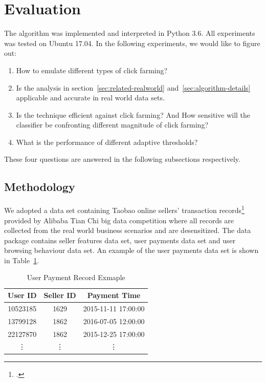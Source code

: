 \documentclass[a4paper]{IEEEtran}
\begin{document}
	\section{Evaluation}\label{sec:evaluation}
		The algorithm was implemented and interpreted in Python 3.6. All experiments was tested on Ubuntu 17.04. In the following experiments, we would like to figure out:
		
		\begin{enumerate}
			\item How to emulate different types of click farming?
			\item Is the analysis in section~\ref{sec:related-realworld} and~\ref{sec:algorithm-details} applicable and accurate in real world data sets.
			\item Is the technique efficient against click farming? And How sensitive will the classifier be confronting different magnitude of click farming?
			\item What is the performance of different adaptive thresholds?
		\end{enumerate}
		
		These four questions are answered in the following subsections respectively.
		
		\subsection{Methodology}\label{sec:exp-methodology}
			We adopted a data set containing Taobao online sellers' transaction records\footcite{https://tianchi.aliyun.com/competition/information.htm?raceId=231591} provided by Alibaba Tian Chi big data competition where all records are collected from the real world business scenarios and are desensitized. The data package contains seller features data set, user payments data set and user browsing behaviour data set. An example of the user payments data set is shown in Table~\ref{tab:user-payment-sample}.
			
			\begin{table}[!ht]
				\centering
				\caption{User Payment Record Exmaple}
				\label{tab:user-payment-sample}
				\begin{tabular}{|c|c|c|}
					\hline
					User ID & Seller ID & Payment Time\\
					\hline
					10523185 & 1629 & 2015-11-11 17:00:00\\
					\hline
					13799128 & 1862 & 2016-07-05 12:00:00\\
					\hline
					22127870 & 1862 & 2015-12-25 17:00:00\\
					\hline
					\vdots & \vdots & \vdots\\
					\hline
				\end{tabular}
			\end{table}
			
\end{document}
